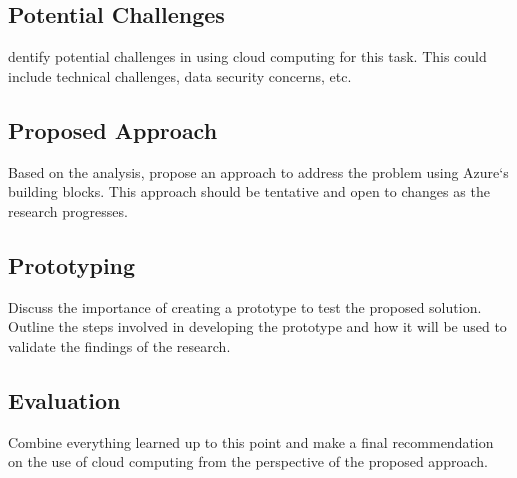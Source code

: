 \subsection{Potential Challenges}
dentify potential challenges in using cloud computing for this task.
This could include technical challenges, data security concerns, etc.

\subsection{Proposed Approach}
Based on the analysis, propose an approach to address the problem using Azure`s building blocks.
This approach should be tentative and open to changes as the research progresses.

\subsection{Prototyping}
Discuss the importance of creating a prototype to test the proposed solution.
Outline the steps involved in developing the prototype and how it will be used to validate the findings of the research.

\subsection{Evaluation}
Combine everything learned up to this point and make a final recommendation
on the use of cloud computing from the perspective of the proposed approach. 